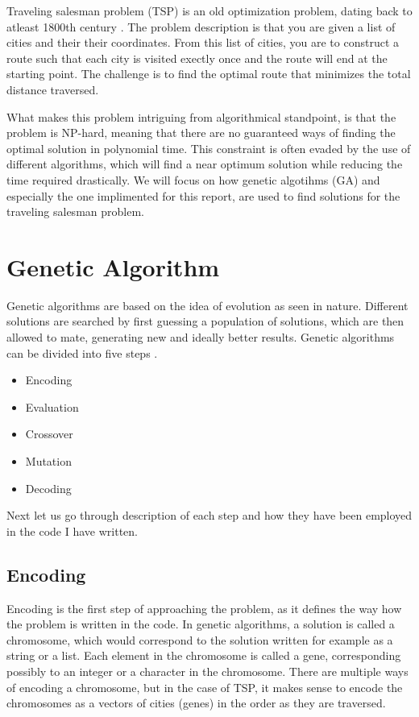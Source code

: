 \documentclass[12pt]{article}
\begin{document}
Traveling salesman problem (TSP) is an old optimization problem, dating back to atleast 1800th
century \cite{Bryant}. The problem description is that you are given a list of cities and their
their coordinates. From this list of cities, you are to construct a route such that each city is
visited exectly once and the route will end at the starting point. The challenge is to find the
optimal route that minimizes the total distance traversed.

What makes this problem intriguing from algorithmical standpoint, is that the problem is
NP-hard, meaning that there are no guaranteed ways of finding the optimal solution in polynomial
time. This constraint is often evaded by the use of different algorithms, which will find a near
optimum solution while reducing the time required drastically. We will focus on how genetic
algotihms (GA) and especially the one implimented for this report, are used to find solutions for
the traveling salesman problem.


\section{Genetic Algorithm}

Genetic algorithms are based on the idea of evolution as seen in nature. Different solutions are
searched by first guessing a population of solutions, which are then allowed to mate,
generating new and ideally better results. Genetic algorithms can be divided into five steps
\cite{Bryant}.
\begin{itemize}
\item Encoding
\item Evaluation
\item Crossover
\item Mutation
\item Decoding
\end{itemize}

Next let us go through description of each step and how they have been employed in the code I
have written.

\subsection{Encoding}

Encoding is the first step of approaching the problem, as it defines the way how the problem is
written in the code. In genetic algorithms, a solution is called a chromosome, which would
correspond to the solution written for example as a string or a list. Each element in the
chromosome is called a gene, corresponding possibly to an integer or a character in the chromosome.
There are multiple ways of encoding a chromosome, but in the case of TSP, it makes sense to
encode the chromosomes as a vectors of cities (genes) in the order as they are traversed.
\end{document}

